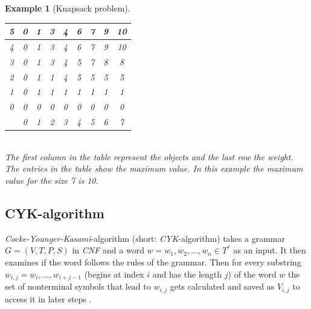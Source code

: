 \documentclass[a4paper, 11pt]{article}
\newtheorem*{example*}{Example}
\begin{document}
\begin{example*}[Knapsack problem]
\begin{minipage}{0.3\textwidth}
\end{minipage}\begin{minipage}{0.1\textwidth}
\ 
\end{minipage}\begin{minipage}{0.6\textwidth}

\begin{tabular}{|c||c|c|c|c|c|c|c|c|}
\hline
5 & 0 & 1 & 3 & 4 & 6 & 7 & 9 & 10 \\
\hline
4 & 0 & 1 & 3 & 4 & 6 & 7 & 9 & 10 \\
\hline
3 & 0 & 1 & 3 & 4 & 5 & 7 & 8 & 8 \\
\hline
2 & 0 & 1 & 1 & 4 & 5 & 5 & 5 & 5 \\
\hline
1 & 0 & 1 & 1 & 1 & 1 & 1 & 1 & 1 \\
\hline
0 & 0 & 0 & 0 & 0 & 0 & 0 & 0 & 0 \\
\hline
\hline
  & 0 & 1 & 2 & 3 & 4 & 5 & 6 & 7 \\
\hline

\end{tabular}

\end{minipage}
\ \\

The first column in the table represent the objects and the last row the weight. The entries in the table show the maximum value. In this example the maximum value for the size 7 is 10.


\end{example*}



\subsection{CYK-algorithm}
\label{cyk}


\textit{Cocke-Younger-Kasami}-algorithm (short: \textit{CYK}-algorithm) takes a grammar $G = (V, T, P, S)$ in \textit{CNF} and a word $w= w_1, w_2, ..., w_n \in T^*$ as an input. It then examines if the word follows the rules of the grammar. Then for every substring $w_{i, j} = w_i, ..., w_{i+j-1}$ (begins at index $i$ and has the length $j$) of the word $w$  the set of nonterminal symbols that lead to $w_{i, j}$ gets calculated and saved as $V_{i, j}$ to access it in later steps \cite{CYK1}. 
\end{document}
